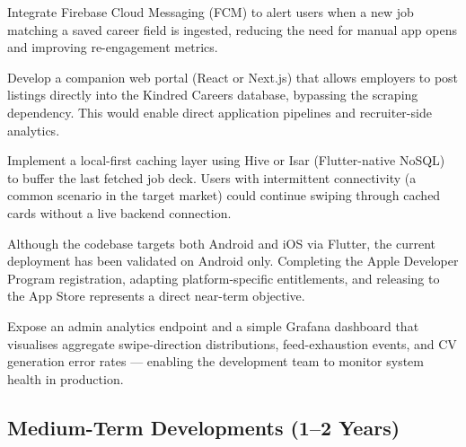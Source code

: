 \documentclass[12pt, a4paper, oneside]{report}
\begin{document}
\begin{description}[leftmargin=2cm, style=nextline, itemsep=8pt]
  \item[Push Notifications]
        Integrate Firebase Cloud Messaging (FCM) to alert users when a new job matching a
        saved career field is ingested, reducing the need for manual app opens and improving
        re-engagement metrics.

  \item[Employer-Side Dashboard]
        Develop a companion web portal (React or Next.js) that allows employers to post
        listings directly into the Kindred Careers database, bypassing the scraping
        dependency. This would enable direct application pipelines and recruiter-side
        analytics.

  \item[Offline Mode]
        Implement a local-first caching layer using Hive or Isar (Flutter-native NoSQL) to
        buffer the last fetched job deck. Users with intermittent connectivity (a common
        scenario in the target market) could continue swiping through cached cards without
        a live backend connection.

  \item[iOS App Store Release]
        Although the codebase targets both Android and iOS via Flutter, the current
        deployment has been validated on Android only. Completing the Apple Developer
        Program registration, adapting platform-specific entitlements, and releasing to the
        App Store represents a direct near-term objective.

  \item[Structured Feedback Analytics Dashboard]
        Expose an admin analytics endpoint and a simple Grafana dashboard that visualises
        aggregate swipe-direction distributions, feed-exhaustion events, and CV generation
        error rates — enabling the development team to monitor system health in production.
\end{description}

\subsection{Medium-Term Developments (1--2 Years)}
\label{sec:future-medium}
\end{document}
